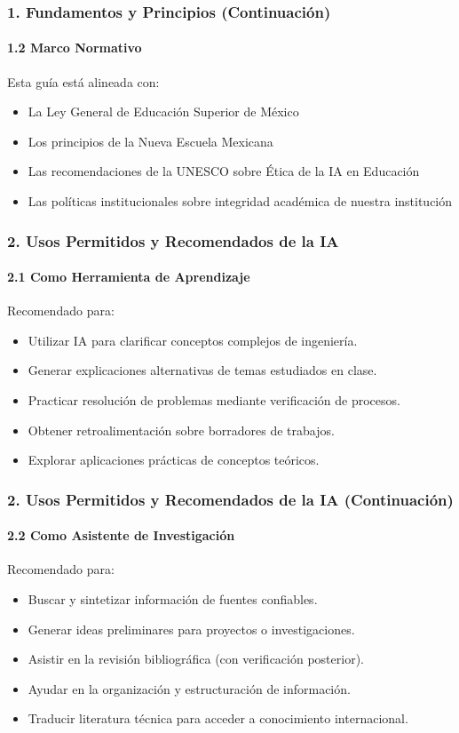 \documentclass{beamer}
\begin{document}
	\begin{frame}
		\frametitle{1. Fundamentos y Principios (Continuación)}
		\framesubtitle{1.2 Marco Normativo}
		Esta guía está alineada con:
		\begin{itemize}
			\item La Ley General de Educación Superior de México
			\item Los principios de la Nueva Escuela Mexicana
			\item Las recomendaciones de la UNESCO sobre Ética de la IA en Educación
			\item Las políticas institucionales sobre integridad académica de nuestra institución
		\end{itemize}
	\end{frame}
	
	\begin{frame}
		\frametitle{2. Usos Permitidos y Recomendados de la IA}
		\framesubtitle{2.1 Como Herramienta de Aprendizaje}
		Recomendado para:
		\begin{itemize}
			\item Utilizar IA para clarificar conceptos complejos de ingeniería.
			\item Generar explicaciones alternativas de temas estudiados en clase.
			\item Practicar resolución de problemas mediante verificación de procesos.
			\item Obtener retroalimentación sobre borradores de trabajos.
			\item Explorar aplicaciones prácticas de conceptos teóricos.
		\end{itemize}
	\end{frame}
	
	\begin{frame}
		\frametitle{2. Usos Permitidos y Recomendados de la IA (Continuación)}
		\framesubtitle{2.2 Como Asistente de Investigación}
		Recomendado para:
		\begin{itemize}
			\item Buscar y sintetizar información de fuentes confiables.
			\item Generar ideas preliminares para proyectos o investigaciones.
			\item Asistir en la revisión bibliográfica (con verificación posterior).
			\item Ayudar en la organización y estructuración de información.
			\item Traducir literatura técnica para acceder a conocimiento internacional.
		\end{itemize}
	\end{frame}
	
\end{document}
